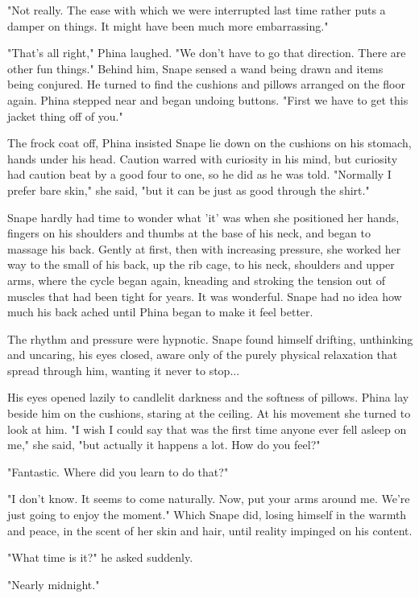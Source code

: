 \documentclass[a4paper,11pt]{article}
\begin{document}
"Not really. The ease with which we were interrupted last time rather puts a damper on things. It might have been much more embarrassing."

"That's all right," Phina laughed. "We don't have to go that direction. There are other fun things." Behind him, Snape sensed a wand being drawn and items being conjured. He turned to find the cushions and pillows arranged on the floor again. Phina stepped near and began undoing buttons. "First we have to get this jacket thing off of you."

The frock coat off, Phina insisted Snape lie down on the cushions on his stomach, hands under his head. Caution warred with curiosity in his mind, but curiosity had caution beat by a good four to one, so he did as he was told. "Normally I prefer bare skin," she said, "but it can be just as good through the shirt."

Snape hardly had time to wonder what 'it' was when she positioned her hands, fingers on his shoulders and thumbs at the base of his neck, and began to massage his back. Gently at first, then with increasing pressure, she worked her way to the small of his back, up the rib cage, to his neck, shoulders and upper arms, where the cycle began again, kneading and stroking the tension out of muscles that had been tight for years. It was wonderful. Snape had no idea how much his back ached until Phina began to make it feel better.

The rhythm and pressure were hypnotic. Snape found himself drifting, unthinking and uncaring, his eyes closed, aware only of the purely physical relaxation that spread through him, wanting it never to stop...

His eyes opened lazily to candlelit darkness and the softness of pillows. Phina lay beside him on the cushions, staring at the ceiling. At his movement she turned to look at him. "I wish I could say that was the first time anyone ever fell asleep on me," she said, "but actually it happens a lot. How do you feel?"

"Fantastic. Where did you learn to do that?"

"I don't know. It seems to come naturally. Now, put your arms around me. We're just going to enjoy the moment." Which Snape did, losing himself in the warmth and peace, in the scent of her skin and hair, until reality impinged on his content.

"What time is it?" he asked suddenly.

"Nearly midnight."
\end{document}
